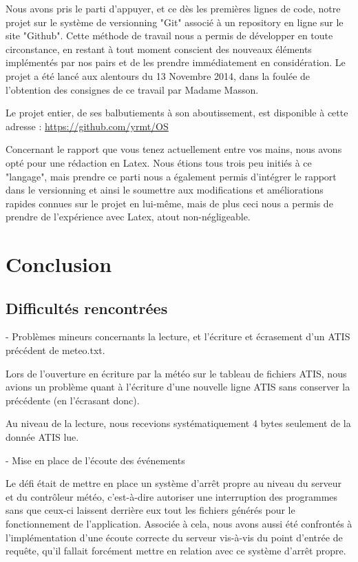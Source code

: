 \documentclass{report}
\begin{document}
{		Nous avons pris le parti d'appuyer, et ce dès les premières lignes de code, notre projet sur le système de versionning "Git" associé
		à un repository en ligne sur le site "Github".
		Cette méthode de travail nous a permis de développer en toute circonstance, en restant à tout moment conscient des nouveaux éléments 
		implémentés par nos pairs et de les prendre immédiatement en considération.
		Le projet a été lancé aux alentours du 13 Novembre 2014, dans la foulée de l'obtention des consignes de ce travail par Madame Masson.

		Le projet entier, de ses balbutiements à son aboutissement, est disponible à cette adresse : \url{https://github.com/yrmt/OS}

		Concernant le rapport que vous tenez actuellement entre vos mains, nous avons opté pour une rédaction en Latex.
		Nous étions tous trois peu initiés à ce "langage", mais prendre ce parti nous a également permis d’intégrer le rapport
		dans le versionning et ainsi le soumettre aux modifications et améliorations rapides connues sur le projet en lui-même, mais de plus
		ceci nous a permis de prendre de l'expérience avec Latex, atout non-négligeable.

\chapter{Conclusion}
	
	\section{Difficultés rencontrées}

		- Problèmes mineurs concernants la lecture, et l'écriture et écrasement d'un ATIS précédent de meteo.txt.

		Lors de l'ouverture en écriture par la météo sur le tableau de fichiers ATIS, nous avions un problème quant à l'écriture d'une nouvelle ligne ATIS sans conserver la précédente (en l'écrasant donc).

		Au niveau de la lecture, nous recevions systématiquement 4 bytes seulement de la donnée ATIS lue.

		- Mise en place de l'écoute des événements

		Le défi était de mettre en place un système d'arrêt propre au niveau du serveur et du contrôleur météo, c'est-à-dire autoriser une interruption des programmes sans que ceux-ci laissent derrière eux tout les fichiers générés pour le fonctionnement de l'application.
		Associée à cela, nous avons aussi été confrontés à l'implémentation d'une écoute correcte du serveur vis-à-vis du point d'entrée de requête, qu'il fallait forcément mettre en relation avec ce système d'arrêt propre.


}
\end{document}
